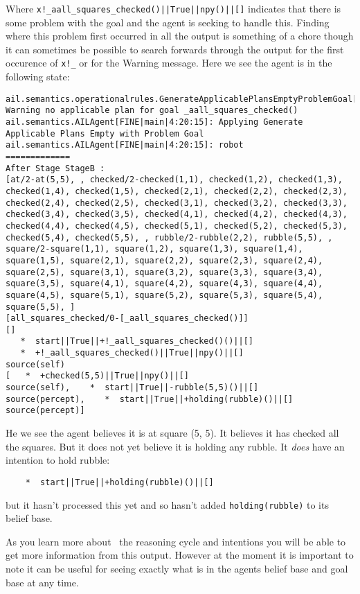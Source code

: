 \documentclass[a4]{article}
\begin{document}
Where \texttt{x!\_aall\_squares_checked()||True||npy()||[]} indicates that there is some problem with the goal and the agent is seeking to handle this.  Finding where this problem first occurred in all the output is something of a chore though it can sometimes be possible to search forwards through the output for the first occurence of \texttt{x!_}  or for the Warning message.  Here we see the agent is in the following state:

\begin{verbatim}
ail.semantics.operationalrules.GenerateApplicablePlansEmptyProblemGoal[WARNING|main|4:20:15]: Warning no applicable plan for goal _aall_squares_checked() 
ail.semantics.AILAgent[FINE|main|4:20:15]: Applying Generate Applicable Plans Empty with Problem Goal 
ail.semantics.AILAgent[FINE|main|4:20:15]: robot
=============
After Stage StageB :
[at/2-at(5,5), , checked/2-checked(1,1), checked(1,2), checked(1,3), checked(1,4), checked(1,5), checked(2,1), checked(2,2), checked(2,3), checked(2,4), checked(2,5), checked(3,1), checked(3,2), checked(3,3), checked(3,4), checked(3,5), checked(4,1), checked(4,2), checked(4,3), checked(4,4), checked(4,5), checked(5,1), checked(5,2), checked(5,3), checked(5,4), checked(5,5), , rubble/2-rubble(2,2), rubble(5,5), , square/2-square(1,1), square(1,2), square(1,3), square(1,4), square(1,5), square(2,1), square(2,2), square(2,3), square(2,4), square(2,5), square(3,1), square(3,2), square(3,3), square(3,4), square(3,5), square(4,1), square(4,2), square(4,3), square(4,4), square(4,5), square(5,1), square(5,2), square(5,3), square(5,4), square(5,5), ]
[all_squares_checked/0-[_aall_squares_checked()]]
[]
   *  start||True||+!_aall_squares_checked()()||[]
   *  +!_aall_squares_checked()||True||npy()||[]
source(self)
[   *  +checked(5,5)||True||npy()||[]
source(self),    *  start||True||-rubble(5,5)()||[]
source(percept),    *  start||True||+holding(rubble)()||[]
source(percept)] 
\end{verbatim}
He we see the agent believes it is at square (5, 5).  It believes it has checked all the squares.  But it does not yet believe it is holding any rubble.  It \emph{does} have an intention to hold rubble:
\begin{verbatim}
    *  start||True||+holding(rubble)()||[]
\end{verbatim}
but it hasn't processed this yet and so hasn't added \texttt{holding(rubble)} to its belief base.

As you learn more about \gwendolen\ the reasoning cycle and intentions you will be able to get more information from this output.  However at the moment it is important to note it can be useful for seeing exactly what is in the agents belief base and goal base at any time.
\end{document}
